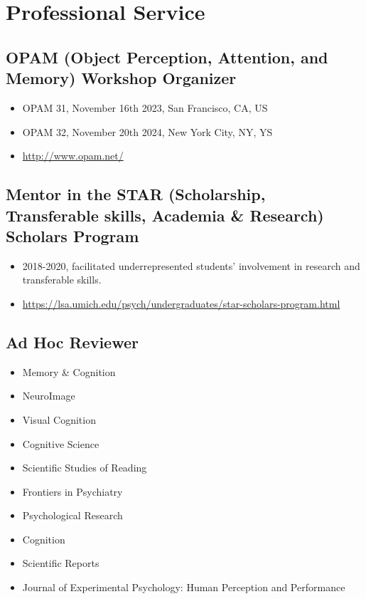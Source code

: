\documentclass[11pt,a4paper,]{awesome-cv}
\providecommand{\tightlist}{%
	\setlength{\itemsep}{0pt}\setlength{\parskip}{0pt}}
\begin{document}
\hypertarget{professional-service}{%
\section{Professional Service}\label{professional-service}}

\hypertarget{opam-object-perception-attention-and-memory-workshop-organizer}{%
\subsection{OPAM (Object Perception, Attention, and Memory) Workshop
Organizer}\label{opam-object-perception-attention-and-memory-workshop-organizer}}

\begin{itemize}
\tightlist
\item
  OPAM 31, November 16th 2023, San Francisco, CA, US
\item
  OPAM 32, November 20th 2024, New York City, NY, YS
\item
  \url{http://www.opam.net/}
\end{itemize}

\hypertarget{mentor-in-the-star-scholarship-transferable-skills-academia-research-scholars-program}{%
\subsection{Mentor in the STAR (Scholarship, Transferable skills,
Academia \& Research) Scholars
Program}\label{mentor-in-the-star-scholarship-transferable-skills-academia-research-scholars-program}}

\begin{itemize}
\tightlist
\item
  2018-2020, facilitated underrepresented students' involvement in
  research and transferable skills.
\item
  \url{https://lsa.umich.edu/psych/undergraduates/star-scholars-program.html}
\end{itemize}

\hypertarget{ad-hoc-reviewer}{%
\subsection{Ad Hoc Reviewer}\label{ad-hoc-reviewer}}

\begin{itemize}
\tightlist
\item
  Memory \& Cognition
\item
  NeuroImage
\item
  Visual Cognition
\item
  Cognitive Science
\item
  Scientific Studies of Reading
\item
  Frontiers in Psychiatry
\item
  Psychological Research
\item
  Cognition
\item
  Scientific Reports
\item
  Journal of Experimental Psychology: Human Perception and Performance
\end{itemize}
\end{document}
